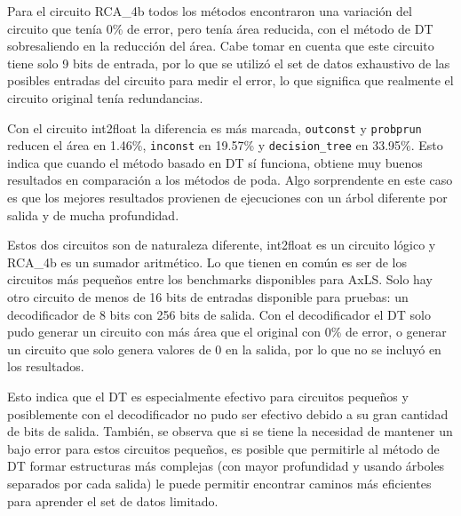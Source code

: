 Para el circuito RCA\_4b todos los métodos encontraron una variación del
circuito que tenía 0\% de error, pero tenía área reducida, con el método de DT
sobresaliendo en la reducción del área. Cabe tomar en cuenta que este circuito
tiene solo 9 bits de entrada, por lo que se utilizó el set de datos exhaustivo
de las posibles entradas del circuito para medir el error, lo que significa que
realmente el circuito original tenía redundancias.

Con el circuito int2float la diferencia es más marcada, \texttt{outconst} y
\texttt{probprun} reducen el área en \num{1.46}\%, \texttt{inconst} en
\num{19.57}\% y \texttt{decision\_tree} en \num{33.95}\%. Esto indica que
cuando el método basado en DT sí funciona, obtiene muy buenos resultados en
comparación a los métodos de poda.
Algo sorprendente en este caso es que los mejores resultados provienen de
ejecuciones con un árbol diferente por salida y de mucha profundidad.

Estos dos circuitos son de naturaleza diferente, int2float es un circuito
lógico y RCA\_4b es un sumador aritmético. Lo que tienen en común es ser de los
circuitos más pequeños entre los benchmarks disponibles para AxLS. Solo hay
otro circuito de menos de 16 bits de entradas disponible para pruebas: un
decodificador de 8 bits con 256 bits de salida. Con el decodificador el DT solo
pudo generar un circuito con más área que el original con 0\% de error, o
generar un circuito que solo genera valores de 0 en la salida, por lo que no se incluyó
en los resultados.

Esto indica que el DT es especialmente efectivo para circuitos pequeños y
posiblemente con el decodificador no pudo ser efectivo debido a su gran
cantidad de bits de salida. También, se observa que si se tiene la necesidad de
mantener un bajo error para estos circuitos pequeños, es posible que
permitirle al método de DT formar estructuras más complejas (con mayor
profundidad y usando árboles separados por cada salida) le puede permitir
encontrar caminos más eficientes para aprender el set de datos limitado.

